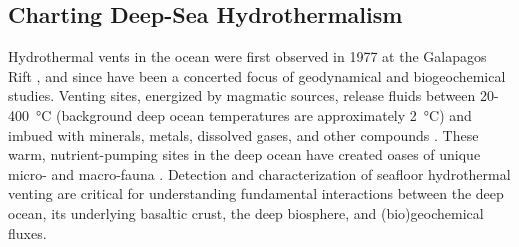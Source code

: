 \subsection{Charting Deep-Sea Hydrothermalism}
\label{sec:charting-plumes}
Hydrothermal vents in the ocean were first observed in 1977 at the Galapagos Rift \cite{corliss1979submarine}, and since have been a concerted focus of geodynamical and biogeochemical studies. Venting sites, energized by magmatic sources, release fluids between 20-\SI{400}{\celsius} (background deep ocean temperatures are approximately \SI{2}{\celsius}) and imbued with minerals, metals, dissolved gases, and other compounds \cite{jannasch1985geomicrobiology, martin2008hydrothermal}. These warm, nutrient-pumping sites in the deep ocean have created oases of unique micro- and macro-fauna \cite{corliss1979submarine}. Detection and characterization of seafloor hydrothermal venting are critical for understanding fundamental interactions between the deep ocean, its underlying basaltic crust, the deep biosphere, and (bio)geochemical fluxes.

